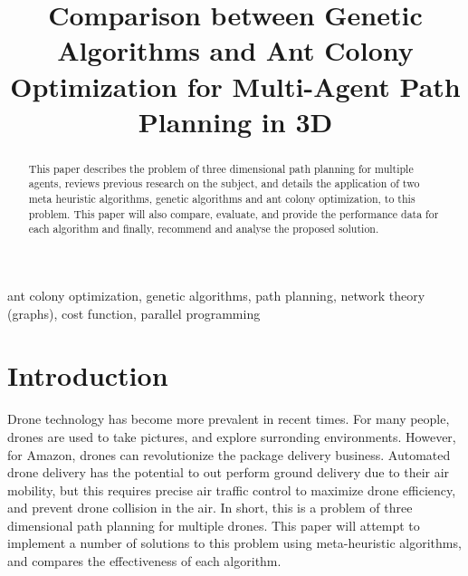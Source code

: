 \documentclass[conference]{IEEEtran}
\begin{document}
\title{Comparison between Genetic Algorithms and Ant Colony Optimization for Multi-Agent Path Planning in 3D}

\author{
\and
{}
\and
{}
\and
{}
\and
{}
\and
{}
}

\maketitle

\begin{abstract}
This paper describes the problem of three dimensional path planning for multiple agents, reviews previous research on the subject, and details the application of two meta heuristic algorithms, genetic algorithms and ant colony optimization, to this problem. This paper will also compare, evaluate, and provide the performance data for each algorithm and finally, recommend and analyse the proposed solution.
\end{abstract}

\begin{IEEEkeywords}
ant colony optimization, genetic algorithms, path planning, network theory (graphs), cost function, parallel programming
\end{IEEEkeywords}

\section{Introduction}
Drone technology has become more prevalent in recent times. For many people, drones are used to take pictures, and explore surronding environments. However, for Amazon, drones can revolutionize the package delivery business. Automated drone delivery has the potential to out perform ground delivery due to their air mobility, but this requires precise air traffic control to maximize drone efficiency, and prevent drone collision in the air. In short, this is a problem of three dimensional path planning for multiple drones. This paper will attempt to implement a number of solutions to this problem using meta-heuristic algorithms, and compares the effectiveness of each algorithm.
\end{document}
